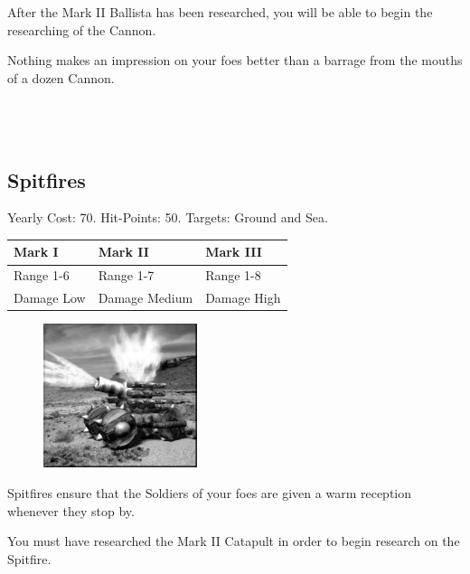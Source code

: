 After the Mark II Ballista has been researched, you will be able to begin the researching of the Cannon.

Nothing makes an impression on your foes better than a barrage from the mouths of a dozen Cannon. \\ \\ \\ \\ 


\subsection{Spitfires}


\begin{center}
	Yearly Cost: 70. Hit-Points: 50. Targets: Ground and Sea.
\end{center}

\begin{tabular}{ | p{4cm} | p{4cm} | p{4cm} |}
	\hline
	\textbf{Mark I}	& \textbf{Mark II} & \textbf{Mark III} \\ \hline
	Range 1-6	& Range 1-7 & Range 1-8 \\ \hline
	Damage Low	& Damage Medium & Damage High \\ \hline
	\hline
\end{tabular}

\begin{figure}
	\vspace{-20pt}
	\begin{center}
		\includegraphics[width=0.4\textwidth]{Aspitfire}
	\end{center}
	\vspace{-20pt}
\end{figure}

Spitfires ensure that the Soldiers of your foes are given a warm reception whenever they stop by.

You must have researched the Mark II Catapult in order to begin research on the Spitfire. 

